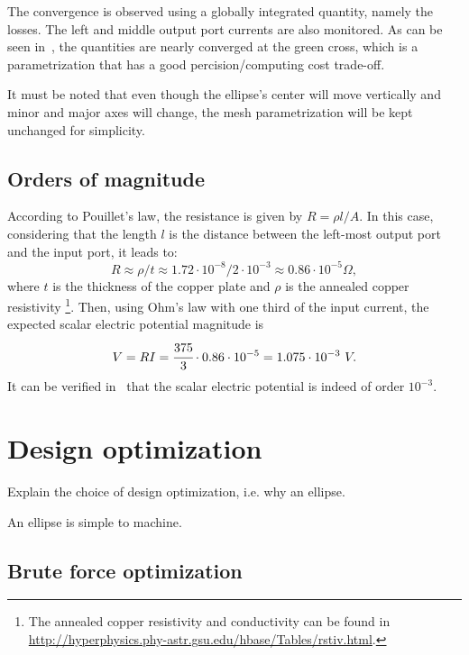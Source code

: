 \documentclass[]{article}
\begin{document}
The convergence is observed using a globally integrated quantity, namely the losses.
The left and middle output port currents are also monitored.
As can be seen in~, the quantities are nearly converged at the green cross,
which is a parametrization that has a good percision/computing cost trade-off.

It must be noted that even though the ellipse's center will move vertically and minor and major axes will change,
the mesh parametrization will be kept unchanged for simplicity.

\subsection{Orders of magnitude}


According to Pouillet's law, the resistance is given by $R = \rho l / A$.
In this case, considering that the length $l$ is the distance between the left-most output port
and the input port, it leads to:
%
\begin{equation}
    R \approx \rho /t \approx 1.72 \cdot 10^{-8} / 2 \cdot 10^{-3} \approx 0.86 \cdot 10^{-5} \Omega,
\end{equation}
%
where $t$ is the thickness of the copper plate and $\rho$ is the annealed copper resistivity
\footnote{The annealed copper resistivity and conductivity can be found in
\url{http://hyperphysics.phy-astr.gsu.edu/hbase/Tables/rstiv.html}.}.
Then, using Ohm's law with one third of the input current, the expected scalar electric potential magnitude is
%
\begin{equation}
    V = R I = \cfrac{375}{3} \cdot 0.86 \cdot 10^{-5} = 1.075 \cdot 10^{-3} \ V.
\end{equation}
%
It can be verified in~ that the scalar electric potential is indeed
of order $10^{-3}$.

\section{Design optimization}

Explain the choice of design optimization, i.e. why an ellipse.

An ellipse is simple to machine.

\subsection{Brute force optimization}
\end{document}
